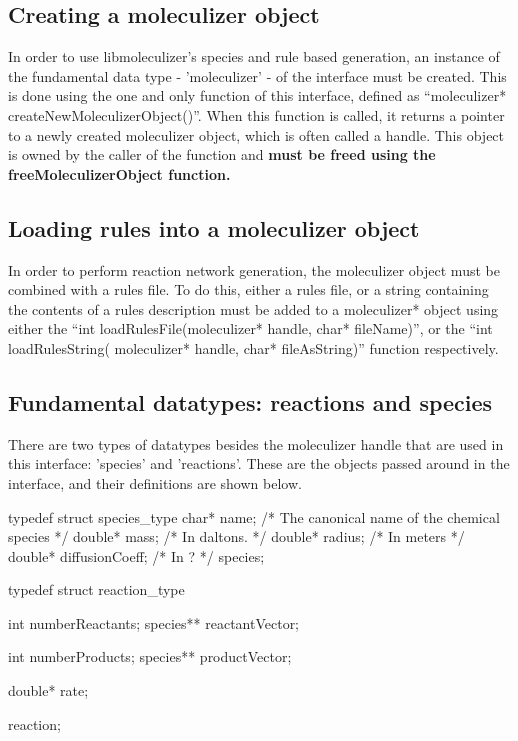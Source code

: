 \subsection{Creating a moleculizer object}
In order to use libmoleculizer's species and rule based generation,
an instance of the fundamental data type - 'moleculizer' - of the
interface must be created.  This is done using the one and only
function of this interface, defined as ``moleculizer*
createNewMoleculizerObject()''.  When this function is called, it
returns a pointer to a newly created moleculizer object, which is
often called a handle.  This object is owned by the caller of the
function and \bf{must} be freed using the freeMoleculizerObject
function.

\subsection{Loading rules into a moleculizer object}
In order to perform reaction network generation, the moleculizer
object must be combined with a rules file.  To do this, either a rules
file, or a string containing the contents of a rules description must
be added to a moleculizer* object using either the ``int
loadRulesFile(moleculizer* handle, char* fileName)'', or the ``int
loadRulesString( moleculizer* handle, char* fileAsString)'' function
respectively.  

\subsection{Fundamental datatypes: reactions and species}
There are two types of datatypes besides the moleculizer handle that are used
in this interface: 'species' and 'reactions'.  These are the objects
passed around in the interface, and their definitions are shown below.

\begin{ExampleC}[caption=Fundamental data-type definitions,
  label=speciesreactiondef]

  typedef struct species_type
    {
      char* name; /* The canonical name of the chemical species */
      double* mass;  /* In daltons. */
      double* radius; /* In meters */ 
      double* diffusionCoeff; /* In ? */
    } species;
    
    typedef struct reaction_type
    {
        int numberReactants;
        species** reactantVector;
        
        int numberProducts;
        species** productVector;
        
        double* rate;
        
    } reaction;

\end{ExampleC}

